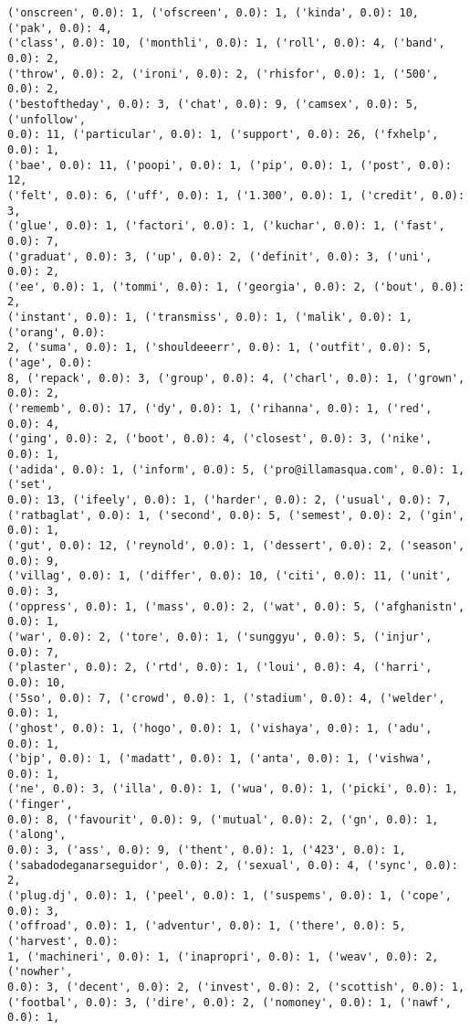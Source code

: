 \documentclass[11pt]{article}
\begin{document}
\begin{Verbatim}[commandchars=\\\{\}]
('onscreen', 0.0): 1, ('ofscreen', 0.0): 1, ('kinda', 0.0): 10, ('pak', 0.0): 4,
('class', 0.0): 10, ('monthli', 0.0): 1, ('roll', 0.0): 4, ('band', 0.0): 2,
('throw', 0.0): 2, ('ironi', 0.0): 2, ('rhisfor', 0.0): 1, ('500', 0.0): 2,
('bestoftheday', 0.0): 3, ('chat', 0.0): 9, ('camsex', 0.0): 5, ('unfollow',
0.0): 11, ('particular', 0.0): 1, ('support', 0.0): 26, ('fxhelp', 0.0): 1,
('bae', 0.0): 11, ('poopi', 0.0): 1, ('pip', 0.0): 1, ('post', 0.0): 12,
('felt', 0.0): 6, ('uff', 0.0): 1, ('1.300', 0.0): 1, ('credit', 0.0): 3,
('glue', 0.0): 1, ('factori', 0.0): 1, ('kuchar', 0.0): 1, ('fast', 0.0): 7,
('graduat', 0.0): 3, ('up', 0.0): 2, ('definit', 0.0): 3, ('uni', 0.0): 2,
('ee', 0.0): 1, ('tommi', 0.0): 1, ('georgia', 0.0): 2, ('bout', 0.0): 2,
('instant', 0.0): 1, ('transmiss', 0.0): 1, ('malik', 0.0): 1, ('orang', 0.0):
2, ('suma', 0.0): 1, ('shouldeeerr', 0.0): 1, ('outfit', 0.0): 5, ('age', 0.0):
8, ('repack', 0.0): 3, ('group', 0.0): 4, ('charl', 0.0): 1, ('grown', 0.0): 2,
('rememb', 0.0): 17, ('dy', 0.0): 1, ('rihanna', 0.0): 1, ('red', 0.0): 4,
('ging', 0.0): 2, ('boot', 0.0): 4, ('closest', 0.0): 3, ('nike', 0.0): 1,
('adida', 0.0): 1, ('inform', 0.0): 5, ('pro@illamasqua.com', 0.0): 1, ('set',
0.0): 13, ('ifeely', 0.0): 1, ('harder', 0.0): 2, ('usual', 0.0): 7,
('ratbaglat', 0.0): 1, ('second', 0.0): 5, ('semest', 0.0): 2, ('gin', 0.0): 1,
('gut', 0.0): 12, ('reynold', 0.0): 1, ('dessert', 0.0): 2, ('season', 0.0): 9,
('villag', 0.0): 1, ('differ', 0.0): 10, ('citi', 0.0): 11, ('unit', 0.0): 3,
('oppress', 0.0): 1, ('mass', 0.0): 2, ('wat', 0.0): 5, ('afghanistn', 0.0): 1,
('war', 0.0): 2, ('tore', 0.0): 1, ('sunggyu', 0.0): 5, ('injur', 0.0): 7,
('plaster', 0.0): 2, ('rtd', 0.0): 1, ('loui', 0.0): 4, ('harri', 0.0): 10,
('5so', 0.0): 7, ('crowd', 0.0): 1, ('stadium', 0.0): 4, ('welder', 0.0): 1,
('ghost', 0.0): 1, ('hogo', 0.0): 1, ('vishaya', 0.0): 1, ('adu', 0.0): 1,
('bjp', 0.0): 1, ('madatt', 0.0): 1, ('anta', 0.0): 1, ('vishwa', 0.0): 1,
('ne', 0.0): 3, ('illa', 0.0): 1, ('wua', 0.0): 1, ('picki', 0.0): 1, ('finger',
0.0): 8, ('favourit', 0.0): 9, ('mutual', 0.0): 2, ('gn', 0.0): 1, ('along',
0.0): 3, ('ass', 0.0): 9, ('thent', 0.0): 1, ('423', 0.0): 1,
('sabadodeganarseguidor', 0.0): 2, ('sexual', 0.0): 4, ('sync', 0.0): 2,
('plug.dj', 0.0): 1, ('peel', 0.0): 1, ('suspems', 0.0): 1, ('cope', 0.0): 3,
('offroad', 0.0): 1, ('adventur', 0.0): 1, ('there', 0.0): 5, ('harvest', 0.0):
1, ('machineri', 0.0): 1, ('inapropri', 0.0): 1, ('weav', 0.0): 2, ('nowher',
0.0): 3, ('decent', 0.0): 2, ('invest', 0.0): 2, ('scottish', 0.0): 1,
('footbal', 0.0): 3, ('dire', 0.0): 2, ('nomoney', 0.0): 1, ('nawf', 0.0): 1,

\end{Verbatim}
\end{document}
